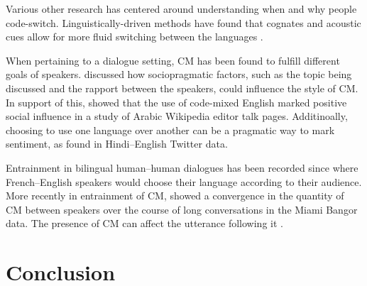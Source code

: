 \documentclass[11pt,a4paper]{article}
\begin{document}

Various other research has centered around understanding when and why people code-switch.
Linguistically-driven methods have found that cognates and acoustic cues allow for more fluid switching between the languages \citep{kootstra2012priming,Fricke2016}.

When pertaining to a dialogue setting, CM has been found to fulfill different goals of speakers. \citet{Solorio2008} discussed how sociopragmatic factors, such as the topic being discussed and the rapport between the speakers, could influence the style of CM.
In support of this, \citet{Yoder2017} showed that the use of code-mixed English marked positive social influence in a study of Arabic Wikipedia editor talk pages.
Additinoally, choosing to use one language over another can be a pragmatic way to mark sentiment, as \citet{rudra2016understanding} found in Hindi--English Twitter data.

Entrainment in bilingual human--human dialogues has been recorded since \citet{giles1973towards} where French--English speakers would choose their language according to their audience.
More recently in entrainment of CM, \citet{soto2018role} showed a convergence in the quantity of CM between speakers over the course of long conversations in the Miami Bangor data.
The presence of CM can affect the utterance following it \citep{fricke2016primed}.


\section{Conclusion}
\label{sec:conclusion}

\end{document}
